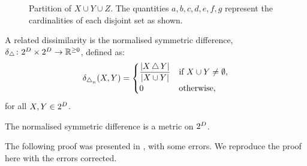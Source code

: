 \begin{figure}
  \centering
  \caption{Partition of $X \cup Y \cup Z$.  The quantities $a,b,c,d,e,f,g$
    represent the cardinalities of each disjoint set as shown.}
  \label{fig:partition}
\end{figure}

A related dissimilarity is the normalised symmetric difference,
$\delta_{\operatorname{\bigtriangleup}} \colon 2^{D} \times 2^{D} \to \mathbb{R}^{\geq 0}$,
defined as:
\begin{equation*}
  \delta_{\operatorname{\bigtriangleup}_n}(X,Y) =
  \begin{cases}
    \displaystyle \frac{|X \operatorname{\bigtriangleup} Y|}{|X \cup Y|} & \text{if $X \cup Y \neq
      \emptyset$}, \\
    0 & \text{otherwise,}
  \end{cases}
\end{equation*}
for all $X,Y \in 2^{D}$.

\begin{thm}
  The normalised symmetric difference is a metric on $2^{D}$.
\end{thm}

The following proof was presented in \citep{yianilos91}, with some errors.  We
reproduce the proof here with the errors corrected.


